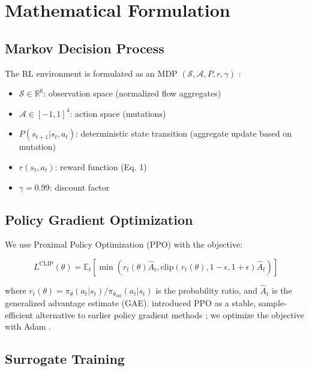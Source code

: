 \documentclass[12pt,a4paper]{report}
\begin{document}
\chapter{Mathematical Formulation}

\section{Markov Decision Process}

The RL environment is formulated as an MDP $(\mathcal{S}, \mathcal{A}, P, r, \gamma)$ \citep{puterman1994markov}:

\begin{itemize}
  \item $\mathcal{S} \in \mathbb{R}^6$: observation space (normalized flow aggregates)
  \item $\mathcal{A} \in [-1, 1]^4$: action space (mutations)
  \item $P(s_{t+1} | s_t, a_t)$: deterministic state transition (aggregate update based on mutation)
  \item $r(s_t, a_t)$: reward function (Eq. 1)
  \item $\gamma = 0.99$: discount factor
\end{itemize}

\section{Policy Gradient Optimization}

We use Proximal Policy Optimization (PPO) with the objective:

\begin{equation}
L^{\text{CLIP}}(\theta) = \mathbb{E}_{t} \left[ \min(r_t(\theta) \hat{A}_t, \text{clip}(r_t(\theta), 1-\epsilon, 1+\epsilon) \hat{A}_t) \right]
\end{equation}

where $r_t(\theta) = \pi_\theta(a_t | s_t) / \pi_{\theta_{\text{old}}}(a_t | s_t)$ is the probability ratio, and $\hat{A}_t$ is the generalized advantage estimate (GAE). \citet{schulman2017proximal} introduced PPO as a stable, sample-efficient alternative to earlier policy gradient methods \citep{sutton2000policy}; we optimize the objective with Adam \citep{kingma2014adam}.

\section{Surrogate Training}
\end{document}
